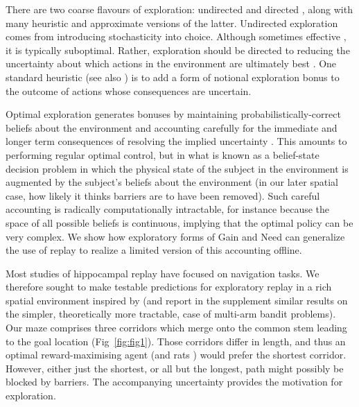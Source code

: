There are two coarse flavours of exploration: undirected and directed \parencite{wilsonBalancingExplorationExploitation2021}, along with many heuristic and approximate versions of the latter. Undirected exploration comes from introducing stochasticity into choice. Although sometimes effective \parencite{dawCorticalSubstratesExploratory2006}, it is typically suboptimal. Rather, exploration should be directed to reducing the uncertainty about which actions in the environment are ultimately best \parencite{feldbaumDualControlTheory1965}.  One standard heuristic \parencite{suttonDynaIntegratedArchitecture1991} (see also \parencite{agrawalTemporalDynamicsOpportunity2020}) is to add a form of notional exploration bonus to the outcome of  actions whose consequences are uncertain.

Optimal exploration generates  bonuses by maintaining probabilistically-correct beliefs about the environment and accounting 
carefully for the immediate and longer term consequences of resolving the implied uncertainty  \parencite{gittinsBanditProcessesDynamic1979,duffQLearningBanditProblems1995}. This amounts to performing regular optimal control, but in what is known as a belief-state decision problem in which the physical state of the subject in the environment is augmented by the subject's beliefs about the environment (in our later spatial case, how likely it thinks barriers are to have been removed). Such careful accounting is radically computationally intractable, for instance because the space of all possible beliefs is continuous, implying that the optimal policy can be very complex. We show how exploratory forms of Gain and Need can generalize the use of replay to realize a limited version of this accounting offline.

Most studies of hippocampal replay  have  focused on  navigation tasks. We therefore sought to make testable predictions for exploratory replay in a rich spatial environment inspired by \textcite{tolmanCognitiveMapsRats1948} 
(and report in the supplement similar results on the simpler, theoretically more tractable, case of multi-arm bandit problems). Our maze comprises three corridors which merge onto the common stem leading to the goal location (Fig~\ref{fig:fig1}). Those corridors differ in length, and thus an optimal reward-maximising agent (and rats \parencite{tolmanCognitiveMapsRats1948}) would prefer the shortest corridor. However, either just the shortest, or all but the longest, path might possibly be blocked by barriers. The accompanying uncertainty provides the motivation for exploration. 

